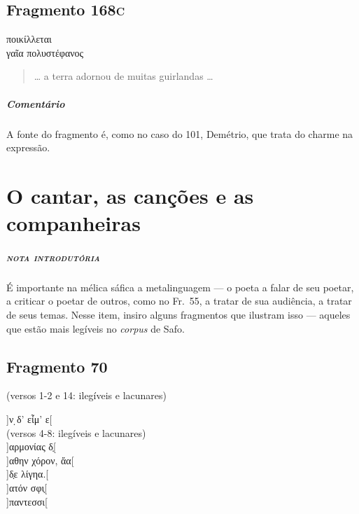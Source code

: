 {\section{Fragmento 168\textsc{c}}

\begin{gkverse}
ποικίλλεται\\
    γαῖα πολυστέφανος 
\end{gkverse}

\begin{verse}
\ldots{} a terra adornou de muitas guirlandas \ldots{}
\end{verse}

{\paragraph{Comentário} A fonte do fragmento é, como no caso do 101, Demétrio, que trata do charme na expressão.}



\chapter[O cantar, as canções e as companheiras]{O cantar, as canções e as companheiras}



\paragraph{\textsc{nota introdutória}}
É importante na mélica sáfica a metalinguagem --- o poeta a falar de seu
poetar, a criticar o poetar de outros, como no Fr.~55, a tratar de sua
audiência, a tratar de seus temas. Nesse item, insiro alguns fragmentos que
ilustram isso --- aqueles que estão mais legíveis no \textit{corpus} de Safo.


\section{Fragmento 70}

\begin{gkverse}
(versos 1-2 e 14: ilegíveis e lacunares)

]ν ̣δ’ εἶμ’ ε[\\
(versos 4-8: ilegíveis e lacunares)\\
]αρμονίας δ̣[\\
         ]αθην χόρον, ἄα[\\
   ]δ̣ε λίγηα.[\\
   ]ατόν σφι̣[\\
  ]παντεσσι[


\end{gkverse}}
